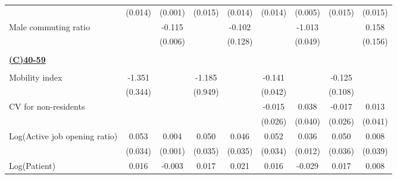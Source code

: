 \begin{tabular}{l*{8}{c}}
                    &     (0.014)         &     (0.001)         &     (0.015)         &     (0.014)         &     (0.014)         &     (0.005)         &     (0.015)         &     (0.015)         \\
\addlinespace
Male commuting ratio&                     &      -0.115\sym{***}&                     &      -0.102         &                     &      -1.013\sym{***}&                     &       0.158         \\
                    &                     &     (0.006)         &                     &     (0.128)         &                     &     (0.049)         &                     &     (0.156)         \\
\hline \\ \multicolumn{9}{l}{\textbf{\underline{(C)40-59}}} \\\\[-1ex]
Mobility index      &      -1.351\sym{***}&                     &      -1.185         &                     &      -0.141\sym{***}&                     &      -0.125         &                     \\
                    &     (0.344)         &                     &     (0.949)         &                     &     (0.042)         &                     &     (0.108)         &                     \\
\addlinespace
CV for non-residents&                     &                     &                     &                     &      -0.015         &       0.038         &      -0.017         &       0.013         \\
                    &                     &                     &                     &                     &     (0.026)         &     (0.040)         &     (0.026)         &     (0.041)         \\
\addlinespace
Log(Active job opening ratio)&       0.053         &       0.004\sym{***}&       0.050         &       0.046         &       0.052         &       0.036\sym{***}&       0.050         &       0.008         \\
                    &     (0.034)         &     (0.001)         &     (0.035)         &     (0.035)         &     (0.034)         &     (0.012)         &     (0.036)         &     (0.039)         \\
\addlinespace
Log(Patient)        &       0.016         &      -0.003\sym{***}&       0.017         &       0.021\sym{*}  &       0.016         &      -0.029\sym{***}&       0.017         &       0.008         \\

\end{tabular}

